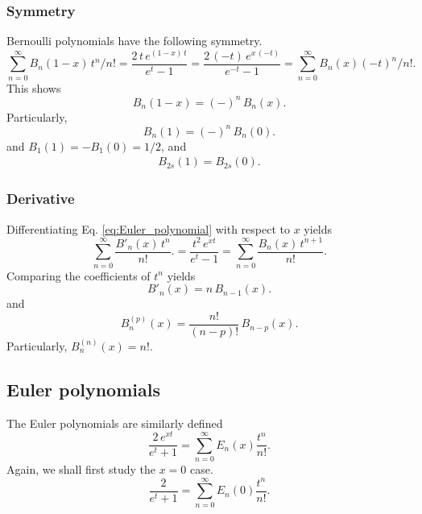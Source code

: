 \documentclass[aip,jcp,preprint,notitlepage, superscriptaddress]{revtex4-1}
\begin{document}
\subsubsection{Symmetry}



Bernoulli polynomials have the following symmetry.
%
\begin{equation*}
\sum_{n = 0}^\infty
B_n(1 - x) \, t^n/n!
=
\frac{ 2 \, t \, e^{(1 - x) \, t} }
{ e^t - 1 }
=
\frac{ 2 \, (-t) \, e^{ x \, (-t)} }
{ e^{-t} - 1 }
=
\sum_{n = 0}^\infty
B_n(x) (-t)^n / n!.
\end{equation*}
%
This shows
\[
B_n(1 - x) = (-)^n \, B_n(x).
\]
Particularly,
\[
B_n(1) = (-)^n \, B_n(0).
\]
and $B_1(1) = -B_1(0) = 1/2$, and
\begin{align}
B_{2s}(1) = B_{2s}(0).
\label{eq:Bernoulli1_even}
\end{align}



\subsubsection{Derivative}




Differentiating Eq. \eqref{eq:Euler_polynomial}
with respect to $x$ yields
\[
\sum_{n = 0}^\infty \frac{ B'_n(x) \, t^{n} } { n! }.
=
\frac{ t^2 \, e^{x t} }
{ e^t - 1 }
=
\sum_{n = 0}^\infty \frac{ B_n(x) \, t^{n + 1} } { n! }.
\]
Comparing the coefficients of $t^n$ yields
\[
B'_n(x)
=
n \, B_{n-1}(x).
\]
and
\begin{equation}
  B^{(p)}_n(x)
=
\frac{n!}{(n-p)!} \, B_{n-p}(x).
\label{eq:dBernoulli_polynomial}
\end{equation}
Particularly,
$B^{(n)}_n(x) = n!$.



\subsection{Euler polynomials}



The Euler polynomials are similarly defined
%
\begin{equation}
  \frac{ 2 \, e^{x t} }
  {e^t + 1}
=
\sum_{n = 0}^\infty
  E_n(x) \frac{ t^n } { n! }.
\label{eq:Euler_polynomial}
\end{equation}
%
Again, we shall first study the $x = 0$ case.
%
\begin{equation}
  \frac{ 2 }
  {e^t + 1}
=
\sum_{n = 0}^\infty
  E_n(0) \frac{ t^n } { n! }.
\label{eq:Euler0}
\end{equation}
\end{document}
